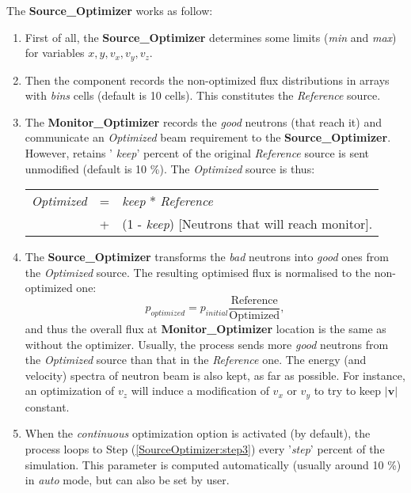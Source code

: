 The \textbf{Source\_Optimizer} works as follow:
\begin{enumerate}
\item{First of all, the \textbf{Source\_Optimizer} determines some limits
    (\textit{min} and \textit{max}) for variables $x, y, v_x, v_y, v_z$.}
\item{Then the component records the non-optimized flux distributions in
    arrays with \textit{bins} cells (default is 10 cells). This constitutes
    the \textit{Reference } source.}
\item{\label {SourceOptimizer:step3}The \textbf{Monitor\_Optimizer} records
    the \textit{good} neutrons (that reach it) and communicate an {\it
      Optimized} beam requirement to the \textbf{Source\_Optimizer}. However, retains '{\it
      keep}' percent of the original \textit{Reference} source is sent
    unmodified (default is 10 \%). The \textit{Optimized} source is thus:

    \begin{center}
      \begin{tabular}{rcl}
        \textit{Optimized} & = & \textit{keep} * \textit{Reference} \\
        & + & (1 - \textit{keep}) [Neutrons that will reach monitor].
      \end{tabular}
    \end{center}
    }
\item{The \textbf{Source\_Optimizer} transforms the \textit{bad} neutrons into
    \textit{good} ones from the \textit{Optimized} source. The resulting
    optimised flux is normalised to the non-optimized one:
    \begin{equation}
      p_{optimized} = p_{initial} \frac{\mbox{Reference}}{\mbox{Optimized}},
    \end{equation}
    and thus the overall flux at \textbf{Monitor\_Optimizer} location is
    the same as without the optimizer. Usually, the process sends more
    \textit{good} neutrons from the \textit{Optimized} source than that in the
    \textit{Reference} one.
    The energy (and velocity) spectra of neutron beam is also kept, as
    far as possible. For instance, an optimization of $v_z$ will induce
    a modification of $v_x$ or $v_y$ to try to keep $|\textbf{v}|$
    constant.
    }
\item{When the \textit{continuous} optimization option is activated (by
    default), the process loops to Step (\ref{SourceOptimizer:step3})
    every '\textit{step}' percent of the simulation. This parameter is
    computed automatically (usually around 10 \%) in \textit{auto} mode,
    but can also be set by user.}
\end{enumerate}


